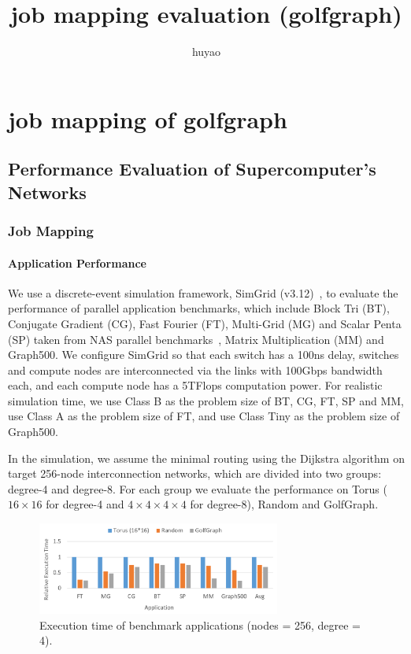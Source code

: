 \documentclass[conference]{IEEEtran}
\begin{document}
\title{job mapping evaluation (golfgraph)}
\author{huyao}
\date{}
\maketitle
\else
\chapter{job mapping of golfgraph}
\fi
\section{Performance Evaluation of Supercomputer's Networks}
\subsection{Job Mapping}

\subsubsection{Application Performance}

We use a discrete-event simulation framework, SimGrid (v3.12)~\cite{SimGrid}, to evaluate the performance of parallel application benchmarks,  which include Block Tri (BT), Conjugate Gradient (CG), Fast Fourier (FT), Multi-Grid (MG) and Scalar Penta (SP) taken from NAS parallel benchmarks~\cite{benchmark}, Matrix Multiplication (MM) and Graph500.   
We configure SimGrid so that each switch has a 100ns delay, switches and compute nodes are interconnected via the links with 100Gbps bandwidth each, and each compute node has a 5TFlops computation power. 
For realistic simulation time, we use Class B as the problem size of BT, CG, FT, SP and MM, use Class A as the problem size of FT, and use Class Tiny as the problem size of Graph500.

In the simulation, we assume the minimal routing using the Dijkstra algorithm on target 256-node interconnection networks, which are divided into two groups: degree-4 and degree-8.
For each group we evaluate the performance on Torus ($16 \times 16$ for degree-4 and $4 \times 4 \times 4 \times 4$ for degree-8), Random and GolfGraph.

\begin{figure}[tb]
	\centering
	\includegraphics[width=8cm]{ps/exec-d4.pdf}
	\caption{Execution time of benchmark applications (nodes = 256, degree = 4).}
	\label{fig:exec-d4}
\end{figure}
\end{document}
